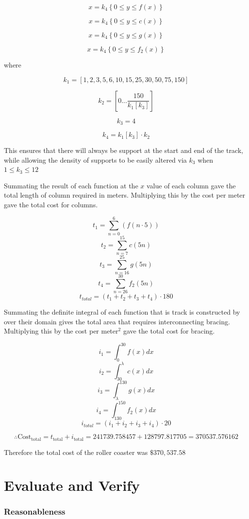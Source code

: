 \documentclass[10pt, letterpaper]{article}
\begin{document}
$$x=k_{4}\left\{0\le y\le f\left(x\right)\right\}$$

$$x=k_{4}\left\{0\le y\le c\left(x\right)\right\}$$

$$x=k_{4}\left\{0\le y\le g\left(x\right)\right\}$$

$$x=k_{4}\left\{0\le y\le f_{2}\left(x\right)\right\}$$

where

$$k_{1}=\left[1,2,3,5,6,10,15,25,30,50,75,150\right]$$

$$k_{2}=\left[0...\frac{150}{k_{1}\left[k_{3}\right]}\right]$$

$$k_{3}=4$$

$$k_{4}=k_{1}\left[k_{3}\right]\cdot k_{2}$$

This ensures that there will always be support at the start and end of the track, while allowing the density of supports to be easily altered via $k_3$ when $1\leq k_3\leq12$

Summating the result of each function at the $x$ value of each column gave the total length of column required in meters. Multiplying this by the cost per meter gave the total cost for columns.



$$t_{1}=\sum_{n=0}^{6}\left(f\left(n\cdot5\right)\right)$$
$$t_{2}=\sum_{n=7}^{15}c\left(5n\right)$$
$$t_{3}=\sum_{n=16}^{25}g\left(5n\right)$$
$$t_{4}=\sum_{n=26}^{30}f_{2}\left(5n\right)$$
$$t_{total}=\left(t_{1}+t_{2}+t_{3}+t_{4}\right)\cdot180$$

Summating the definite integral of each function that is track is constructed by over their domain gives the total area that requires interconnecting bracing. Multiplying this by the cost per meter$^2$ gave the total cost for bracing.

$$i_{1}=\int_{0}^{30}f\left(x\right)dx$$
$$i_{2}=\int_{30}^{\lambda}c\left(x\right)dx$$
$$i_{3}=\int_{\lambda}^{130}g\left(x\right)dx$$
$$i_{4}=\int_{130}^{150}f_{2}\left(x\right)dx$$
$$i_{total}=\left(i_{1}+i_{2}+i_{3}+i_{4}\right)\cdot20$$


 $$\therefore \textrm{Cost}_{\mathrm{total}}=t_\mathrm{total}+i_\mathrm{total}=241739.758457+128797.817705=370537.576162$$

Therefore the total cost of the roller coaster was $\$370,537.58$
\section{Evaluate and Verify}
\subsubsection{Reasonableness}
\end{document}
